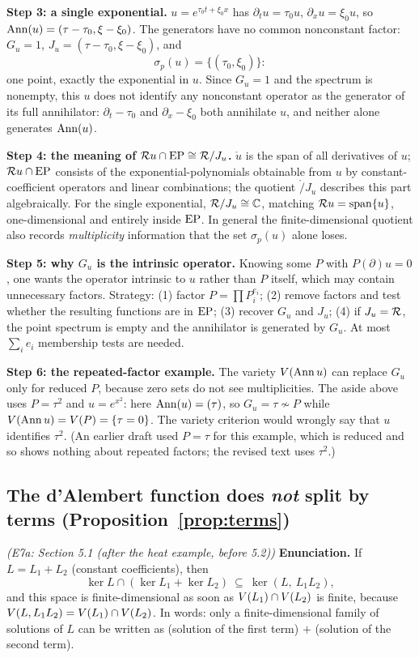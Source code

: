 \medskip\textbf{Step 3: a single exponential.} $u=e^{\tau_0t+\xi_0x}$ has $\partial_tu=\tau_0u$, $\partial_xu=\xi_0u$, so $\operatorname{Ann}(u)=(\tau-\tau_0,\xi-\xi_0)$. The generators have no common nonconstant factor: $G_u=1$, $J_u=(\tau-\tau_0,\xi-\xi_0)$, and
\[
\sigma_p(u)=\{(\tau_0,\xi_0)\}:
\]
one point, exactly the exponential in $u$. Since $G_u=1$ and the spectrum is nonempty, this $u$ does not identify any nonconstant operator as the generator of its full annihilator: $\partial_t-\tau_0$ and $\partial_x-\xi_0$ both annihilate $u$, and neither alone generates $\operatorname{Ann}(u)$.

\medskip\textbf{Step 4: the meaning of $\mathcal{R} u\cap\mathrm{EP}\cong\mathcal{R}/J_u$.} $\ring u$ is the span of all derivatives of $u$; $\mathcal{R} u\cap\mathrm{EP}$ consists of the exponential-polynomials obtainable from $u$ by constant-coefficient operators and linear combinations; the quotient $\ring/J_u$ describes this part algebraically. For the single exponential, $\mathcal{R}/J_u\cong\mathbb{C}$, matching $\mathcal{R} u=\operatorname{span}\{u\}$, one-dimensional and entirely inside $\mathrm{EP}$. In general the finite-dimensional quotient also records \emph{multiplicity} information that the set $\sigma_p(u)$ alone loses.

\medskip\textbf{Step 5: why $G_u$ is the intrinsic operator.} Knowing some $P$ with $P(\partial)u=0$, one wants the operator intrinsic to $u$ rather than $P$ itself, which may contain unnecessary factors. Strategy: (1) factor $P=\prod P_i^{e_i}$; (2) remove factors and test whether the resulting functions are in $\mathrm{EP}$; (3) recover $G_u$ and $J_u$; (4) if $J_u=\mathcal{R}$, the point spectrum is empty and the annihilator is generated by $G_u$. At most $\sum_ie_i$ membership tests are needed.

\medskip\textbf{Step 6: the repeated-factor example.} The variety $V(\operatorname{Ann} u)$ can replace $G_u$ only for reduced $P$, because zero sets do not see multiplicities. The aside above uses $P=\tau^2$ and $u=e^{x^2}$: here $\operatorname{Ann}(u)=(\tau)$, so $G_u=\tau\not\sim P$ while $V(\operatorname{Ann} u)=V(P)=\{\tau=0\}$. The variety criterion would wrongly say that $u$ identifies $\tau^2$. (An earlier draft used $P=\tau$ for this example, which is reduced and so shows nothing about repeated factors; the revised text uses $\tau^2$.)

\subsection{The d'Alembert function does \emph{not} split by terms (Proposition~\ref{prop:terms})}\label{expl:E7a}
\noindent\emph{(E7a: Section 5.1 (after the heat example, before 5.2))}
\textbf{Enunciation.} If $L=L_1+L_2$ (constant coefficients), then
\[
\ker L\cap(\ker L_1+\ker L_2)\ \subseteq\ \ker(L,\ L_1L_2),
\]
and this space is finite-dimensional as soon as $V(L_1)\cap V(L_2)$ is finite, because $V(L,L_1L_2)=V(L_1)\cap V(L_2)$. In words: only a finite-dimensional family of solutions of $L$ can be written as (solution of the first term) $+$ (solution of the second term).

